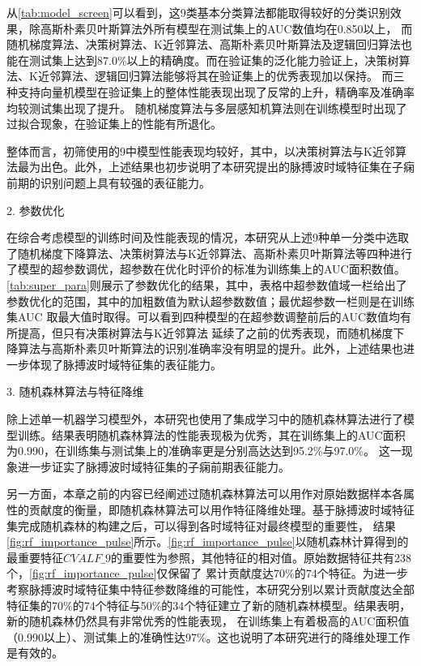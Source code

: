 从\autoref{tab:model_screen}可以看到，这9类基本分类算法都能取得较好的分类识别效果，除高斯朴素贝叶斯算法外所有模型在测试集上的AUC数值均在0.850以上，
而随机梯度算法、决策树算法、K近邻算法、高斯朴素贝叶斯算法及逻辑回归算法也能在测试集上达到87.0\%以上的精确度。而在验证集的泛化能力验证上，决策树算法、K近邻算法、逻辑回归算法能够将其在验证集上的优秀表现加以保持。
而三种支持向量机模型在验证集上的整体性能表现出现了反常的上升，精确率及准确率均较测试集出现了提升。
随机梯度算法与多层感知机算法则在训练模型时出现了过拟合现象，在验证集上的性能有所退化。

整体而言，初筛使用的9中模型性能表现均较好，其中，以决策树算法与K近邻算法最为出色。此外，上述结果也初步说明了本研究提出的脉搏波时域特征集在子痫前期的识别问题上具有较强的表征能力。


2. 参数优化

在综合考虑模型的训练时间及性能表现的情况，本研究从上述9种单一分类中选取了随机梯度下降算法、决策树算法与K近邻算法、高斯朴素贝叶斯算法等四种进行了模型的超参数调优，超参数在优化时评价的标准为训练集上的AUC面积数值。
\autoref{tab:super_para}则展示了参数优化的结果，其中，表格中超参数值域一栏给出了参数优化的范围，其中的加粗数值为默认超参数数值；最优超参数一栏则是在训练集AUC
取最大值时取得。可以看到四种模型的在超参数调整前后的AUC数值均有所提高，但只有决策树算法与K近邻算法
延续了之前的优秀表现，而随机梯度下降算法与高斯朴素贝叶斯算法的识别准确率没有明显的提升。此外，上述结果也进一步体现了脉搏波时域特征集的表征能力。


3. 随机森林算法与特征降维

除上述单一机器学习模型外，本研究也使用了集成学习中的随机森林算法进行了模型训练。结果表明随机森林算法的性能表现极为优秀，其在训练集上的AUC面积为0.990，在训练集与测试集上的准确率更是分别高达达到95.2\%与97.0\%。
这一现象进一步证实了脉搏波时域特征集的子痫前期表征能力。

另一方面，本章之前的内容已经阐述过随机森林算法可以用作对原始数据样本各属性的贡献度的衡量，即随机森林算法可以用作特征降维处理。基于脉搏波时域特征集完成随机森林的构建之后，可以得到各时域特征对最终模型的重要性，
结果\autoref{fig:rf_importance_pulse}所示。\autoref{fig:rf_importance_pulse}以随机森林计算得到的最重要特征$CVALF\_9$的重要性为参照，其他特征的相对值。原始数据特征共有238个，\autoref{fig:rf_importance_pulse}仅保留了
累计贡献度达70\%的74个特征。为进一步考察脉搏波时域特征集中特征参数降维的可能性，本研究分别以累计贡献度达全部特征集的70\%的74个特征与50\%的34个特征建立了新的随机森林模型。结果表明，新的随机森林仍然具有非常优秀的性能表现，
在训练集上有着极高的AUC面积值（0.990以上）、测试集上的准确性达97\%。这也说明了本研究进行的降维处理工作是有效的。

